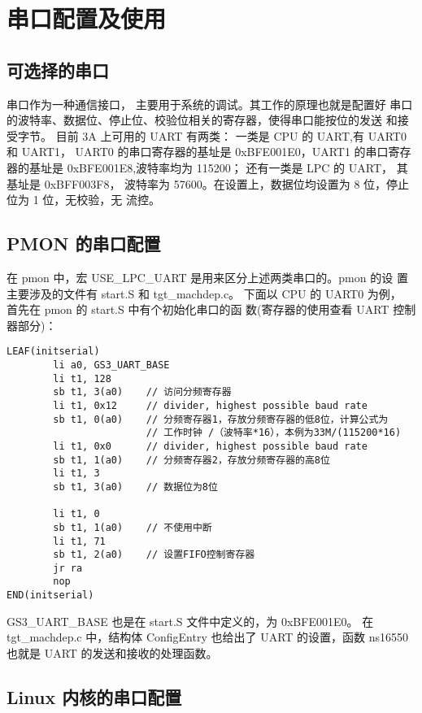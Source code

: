 \chapter{串口配置及使用}

\section{可选择的串口}

串口作为一种通信接口， 主要用于系统的调试。其工作的原理也就是配置好
串口的波特率、数据位、停止位、校验位相关的寄存器，使得串口能按位的发送
和接受字节。 目前 3A 上可用的 UART 有两类： 一类是 CPU 的 UART,有 UART0 和
UART1， UART0 的串口寄存器的基址是 0xBFE001E0，UART1 的串口寄存器的基址是
0xBFE001E8,波特率均为 115200； 还有一类是 LPC 的 UART， 其基址是 0xBFF003F8，
波特率为 57600。在设置上，数据位均设置为 8 位，停止位为 1 位，无校验，无 流控。

\section{PMON 的串口配置}

在 pmon 中，宏 USE\_LPC\_UART 是用来区分上述两类串口的。pmon 的设
置主要涉及的文件有 start.S 和 tgt\_machdep.c。 下面以 CPU 的 UART0 为例，
首先在 pmon 的 start.S 中有个初始化串口的函 数(寄存器的使用查看 UART
控制器部分)：

\begin{lstlisting}
LEAF(initserial)
        li a0, GS3_UART_BASE
        li t1, 128
        sb t1, 3(a0)    // 访问分频寄存器
        li t1, 0x12     // divider, highest possible baud rate
        sb t1, 0(a0)    // 分频寄存器1，存放分频寄存器的低8位，计算公式为
                        // 工作时钟 /（波特率*16），本例为33M/(115200*16)
        li t1, 0x0      // divider, highest possible baud rate
        sb t1, 1(a0)    // 分频寄存器2，存放分频寄存器的高8位   
        li t1, 3
        sb t1, 3(a0)    // 数据位为8位

        li t1, 0
        sb t1, 1(a0)    // 不使用中断
        li t1, 71
        sb t1, 2(a0)    // 设置FIFO控制寄存器
        jr ra
        nop
END(initserial)
\end{lstlisting}

GS3\_UART\_BASE 也是在 start.S 文件中定义的，为 0xBFE001E0。 在 tgt\_machdep.c
中，结构体 ConfigEntry 也给出了 UART 的设置，函数 ns16550 也就是 UART
的发送和接收的处理函数。

\section{Linux 内核的串口配置}

